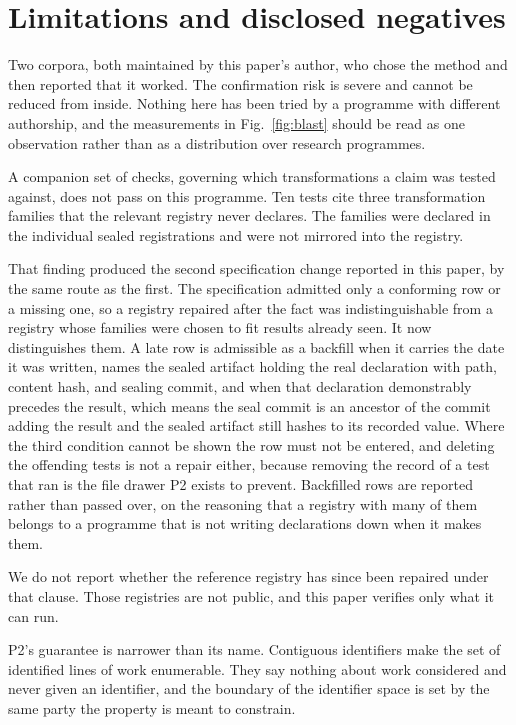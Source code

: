 \documentclass[journal]{IEEEtran}
\begin{document}
\section{Limitations and disclosed negatives}
\label{sec:limits}

Two corpora, both maintained by this paper's author, who chose the method and
then reported that it worked. The confirmation risk is severe and cannot be
reduced from inside. Nothing here has been tried by a programme with different
authorship, and the measurements in Fig.~\ref{fig:blast} should be read as one
observation rather than as a distribution over research programmes.

A companion set of checks, governing which transformations a claim was tested
against, does not pass on this programme. Ten tests cite three transformation
families that the relevant registry never declares. The families were declared in
the individual sealed registrations and were not mirrored into the registry.

That finding produced the second specification change reported in this paper, by
the same route as the first. The specification admitted only a conforming row or
a missing one, so a registry repaired after the fact was indistinguishable from a
registry whose families were chosen to fit results already seen. It now
distinguishes them. A late row is admissible as a backfill when it carries the
date it was written, names the sealed artifact holding the real declaration with
path, content hash, and sealing commit, and when that declaration demonstrably
precedes the result, which means the seal commit is an ancestor of the commit
adding the result and the sealed artifact still hashes to its recorded value.
Where the third condition cannot be shown the row must not be entered, and
deleting the offending tests is not a repair either, because removing the record
of a test that ran is the file drawer P2 exists to prevent. Backfilled rows are
reported rather than passed over, on the reasoning that a registry with many of
them belongs to a programme that is not writing declarations down when it makes
them.

We do not report whether the reference registry has since been repaired under
that clause. Those registries are not public, and this paper verifies only what
it can run.

P2's guarantee is narrower than its name. Contiguous identifiers make the set of
identified lines of work enumerable. They say nothing about work considered and
never given an identifier, and the boundary of the identifier space is set by the
same party the property is meant to constrain.
\end{document}

